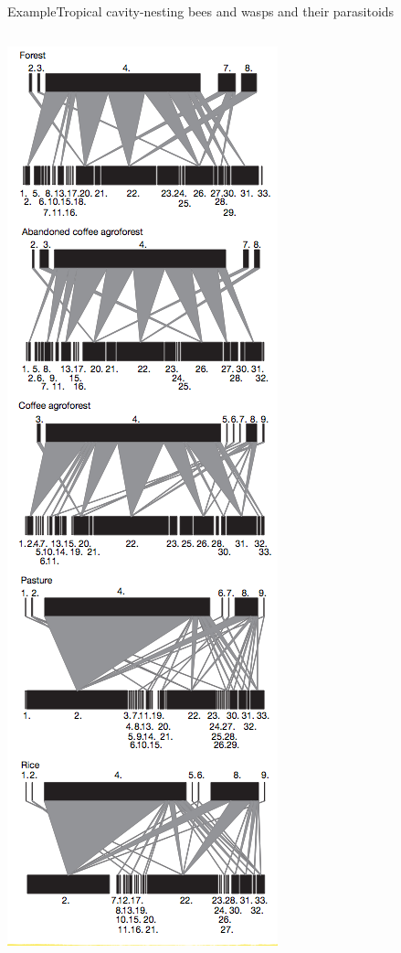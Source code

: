 \documentclass{eecslides}
\begin{document}
\begin{frame}{Example}{Tropical cavity-nesting bees and wasps and their parasitoids}
\begin{columns}
		\begin{column}{0.3\textwidth}
			\begin{center}
				\includegraphics[height=0.65\textheight]{tylianakis}\\
			\end{center}
		\end{column}				
	\end{columns}	   
	\end{frame}
\end{document}
